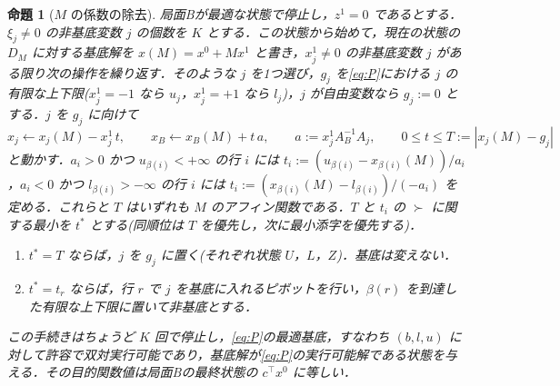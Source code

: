 \documentclass[11pt,a4paper]{ltjsarticle}
\theoremstyle{plain}
\newtheorem{proposition}[theorem]{命題}
\theoremstyle{definition}
\theoremstyle{remark}
\begin{document}
\begin{proposition}[$M$ の係数の除去]
\label{prop:cleanup}
局面Bが最適な状態で停止し，$z^1=0$ であるとする．$\xi_j\neq0$ の非基底変数 $j$ の個数を $K$ とする．この状態から始めて，現在の状態の $D_M$ に対する基底解を $x(M)=x^0+Mx^1$ と書き，$x^1_j\neq0$ の非基底変数 $j$ がある限り次の操作を繰り返す．そのような $j$ を1つ選び，$g_j$ を\eqref{eq:P}における $j$ の有限な上下限($x^1_j=-1$ なら $u_j$，$x^1_j=+1$ なら $l_j$)，$j$ が自由変数なら $g_j:=0$ とする．$j$ を $g_j$ に向けて
\[
  x_j\gets x_j(M)-x^1_j\,t,\qquad x_B\gets x_B(M)+t\,a,\qquad a:=x^1_jA_B^{-1}A_j,\qquad 0\le t\le T:=|x_j(M)-g_j|
\]
と動かす．$a_i>0$ かつ $u_{\beta(i)}<+\infty$ の行 $i$ には $t_i:=(u_{\beta(i)}-x_{\beta(i)}(M))/a_i$，$a_i<0$ かつ $l_{\beta(i)}>-\infty$ の行 $i$ には $t_i:=(x_{\beta(i)}(M)-l_{\beta(i)})/(-a_i)$ を定める．これらと $T$ はいずれも $M$ のアフィン関数である．$T$ と $t_i$ の $\succ$ に関する最小を $t^\ast$ とする(同順位は $T$ を優先し，次に最小添字を優先する)．
\begin{enumerate}[label=(\Alph*)]
\item $t^\ast=T$ ならば，$j$ を $g_j$ に置く(それぞれ状態 $U$，$L$，$Z$)．基底は変えない．
\item $t^\ast=t_r$ ならば，行 $r$ で $j$ を基底に入れるピボットを行い，$\beta(r)$ を到達した有限な上下限に置いて非基底とする．
\end{enumerate}
この手続きはちょうど $K$ 回で停止し，\eqref{eq:P}の最適基底，すなわち $(b,l,u)$ に対して許容で双対実行可能であり，基底解が\eqref{eq:P}の実行可能解である状態を与える．その目的関数値は局面Bの最終状態の $c^\top x^0$ に等しい．
\end{proposition}
\end{document}
